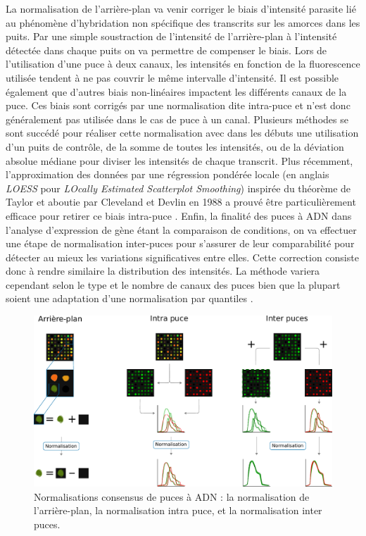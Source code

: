 La normalisation de l'arrière-plan va venir corriger le biais d'intensité parasite lié au phénomène d'hybridation non spécifique des transcrits sur les amorces dans les puits. Par une simple soustraction de l'intensité de l'arrière-plan à l'intensité détectée dans chaque puits on va permettre de compenser le biais. Lors de l'utilisation d'une puce à deux canaux, les intensités en fonction de la fluorescence utilisée tendent à ne pas couvrir le même intervalle d'intensité. Il est possible également que d'autres biais non-linéaires impactent les différents canaux de la puce. Ces biais sont corrigés par une normalisation dite intra-puce et n'est donc généralement pas utilisée dans le cas de puce à un canal. Plusieurs méthodes se sont succédé pour réaliser cette normalisation avec dans les débuts une utilisation d'un puits de contrôle, de la somme de toutes les intensités, ou de la déviation absolue médiane pour diviser les intensités de chaque transcrit. Plus récemment, l'approximation des données par une régression pondérée locale (en anglais \textit{LOESS} pour \textit{LOcally Estimated Scatterplot Smoothing}) inspirée du théorème de Taylor et aboutie par Cleveland et Devlin en 1988 \cite{Cleveland1988Sep} a prouvé être particulièrement efficace pour retirer ce biais intra-puce \cite{Smyth2003Dec}. Enfin, la finalité des puces à ADN dans l'analyse d'expression de gène étant la comparaison de conditions, on va effectuer une étape de normalisation inter-puces pour s'assurer de leur comparabilité pour détecter au mieux les variations significatives entre elles. Cette correction consiste donc à rendre similaire la distribution des intensités. La méthode variera cependant selon le type et le nombre de canaux des puces bien que la plupart soient une adaptation d'une normalisation par quantiles \cite{Ritchie2015Apr}. \\

\begin{figure}[!h]
    \centering
    \includegraphics[width=\textwidth]{img/intro/2_meth_transcripto/intro_2_microarray_normalization.pdf}
    \caption[Normalisations consensus de puces à ADN]{Normalisations consensus de puces à ADN : la normalisation de l'arrière-plan, la normalisation intra puce, et la normalisation inter puces.}
    \label{fig:intro_microarray_normalization}
\end{figure}


